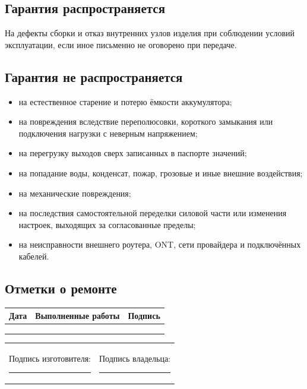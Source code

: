 \documentclass[11pt,a4paper]{article}
\begin{document}
\subsection*{Гарантия распространяется}
На дефекты сборки и отказ внутренних узлов изделия при соблюдении условий эксплуатации, если иное письменно не оговорено при передаче.

\subsection*{Гарантия не распространяется}
\begin{itemize}[leftmargin=7mm]
  \item на естественное старение и потерю ёмкости аккумулятора;
  \item на повреждения вследствие переполюсовки, короткого замыкания или подключения нагрузки с неверным напряжением;
  \item на перегрузку выходов сверх записанных в паспорте значений;
  \item на попадание воды, конденсат, пожар, грозовые и иные внешние воздействия;
  \item на механические повреждения;
  \item на последствия самостоятельной переделки силовой части или изменения настроек, выходящих за согласованные пределы;
  \item на неисправности внешнего роутера, ONT, сети провайдера и подключённых кабелей.
\end{itemize}

\subsection*{Отметки о ремонте}
\begin{tabularx}{\textwidth}{@{}p{25mm}Xp{35mm}@{}}
\toprule
\textbf{Дата} & \textbf{Выполненные работы} & \textbf{Подпись} \\
\midrule
\rule{0pt}{10mm} & & \\
\midrule
\rule{0pt}{10mm} & & \\
\midrule
\rule{0pt}{10mm} & & \\
\bottomrule
\end{tabularx}

\vfill
\begin{tabular}{@{}p{72mm}p{72mm}@{}}
Подпись изготовителя: \rule{35mm}{0.4pt} & Подпись владельца: \rule{35mm}{0.4pt} \\
\end{tabular}
\end{document}
